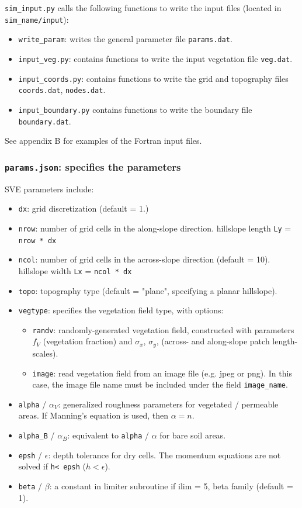 \documentclass{article}
\newcommand{\code}[1]{\texttt{#1}}
\begin{document}
\code{sim\_input.py} calls the following functions to write the input files (located in \code{sim\_name/input}):
\begin{itemize}
	\item \code{write\_param}: writes the general parameter file  \code{params.dat}.
	\item \code{input\_veg.py}: contains functions to write the input vegetation file \code{veg.dat}.
	\item \code{input\_coords.py}: contains functions to write the  grid and topography files \code{coords.dat}, \code{nodes.dat}. 
	\item \code{input\_boundary.py} contains functions to write the boundary file \code{boundary.dat}.
\end{itemize}

See appendix B for examples of the Fortran input files.

\subsubsection{\code{params.json}: specifies the parameters}
SVE parameters include:
\begin{itemize}
	\item \code{dx}: grid discretization (default = 1.)  
	\item \code{nrow}:  number of grid cells in the along-slope direction.
		\subitem hillslope length \code{Ly} = \code{nrow * dx} 
	\item \code{ncol}:  number of grid cells in the across-slope direction (default = 10).
	 	\subitem hillslope width \code{Lx} = \code{ncol * dx} 
	\item \code{topo}: topography type (default = "plane", specifying a planar hillslope). 

	\item \code{vegtype}: specifies the vegetation field type, with options:
		\begin{itemize}
		\item \code{randv}: randomly-generated vegetation field, constructed with parameters $f_V$ (vegetation fraction) and $\sigma_x$, $\sigma_y$, (across- and along-slope patch length-scales).
	    \item \code{image}: read vegetation field from an image file (e.g. jpeg or png). In this case, the image file name must be included under the field \code{image\_name}.
		\end{itemize}
	\item \code{alpha} / $\alpha_V$: generalized roughness parameters for vegetated / permeable areas. If Manning's equation is used, then  $\alpha = n$.
	\item \code{alpha\_B} / $\alpha_B$: equivalent to \code{alpha} / $\alpha$   for bare soil areas.
	\item \code{epsh} / $\epsilon$: depth tolerance for dry cells.  The momentum equations are not solved if \code{h< epsh} ($h<\epsilon$).
	\item \code{beta} / $\beta$: a constant in limiter subroutine if ilim = 5, beta family (default = 1).   
\end{itemize}
\end{document}
